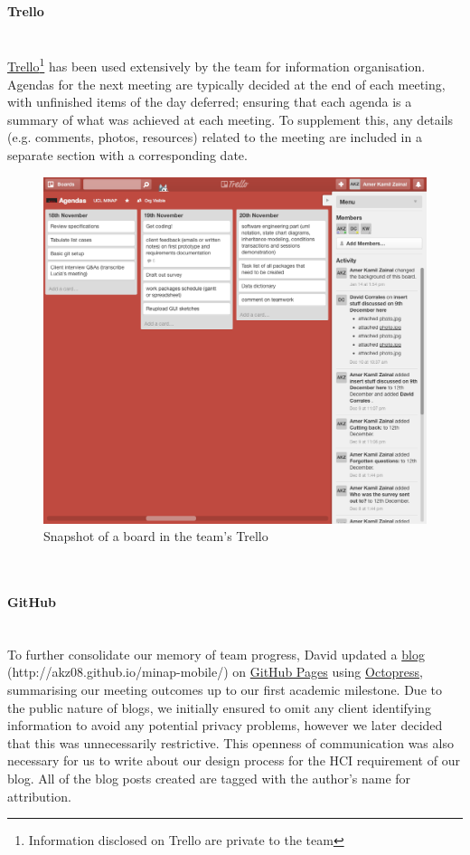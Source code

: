 \documentclass[12pt,a4paper,oneside,titlepage]{article}
\begin{document}
\paragraph{Trello} ~\\
\href{https://trello.com}{Trello}\footnote{Information disclosed on Trello are private to the team} has been used extensively by the team for information organisation. Agendas for the next meeting are typically decided at the end of each meeting, with unfinished items of the day deferred; ensuring that each agenda is a summary of what was achieved at each meeting. To supplement this, any details (e.g. comments, photos, resources) related to the meeting are included in a separate section with a corresponding date. 
\begin{figure}[h!]
\centering
\includegraphics[scale=0.35]{img/trello.png}
\caption{Snapshot of a board in the team's Trello}
\end{figure}
\\
\newpage
\paragraph{GitHub} ~\\
To further consolidate our memory of team progress, David updated a \href{http://akz08.github.io/minap-mobile/}{blog} \\(http://akz08.github.io/minap-mobile/) on \href{http://pages.github.com/}{GitHub Pages} using \href{http://octopress.org/}{Octopress}, summarising our meeting outcomes up to our first academic milestone. Due to the public nature of blogs, we initially ensured to omit any client identifying information to avoid any potential privacy problems, however we later decided that this was unnecessarily restrictive. This openness of communication was also necessary for us to write about our design process for the HCI requirement of our blog. All of the blog posts created are tagged with the author's name for attribution.
\end{document}
